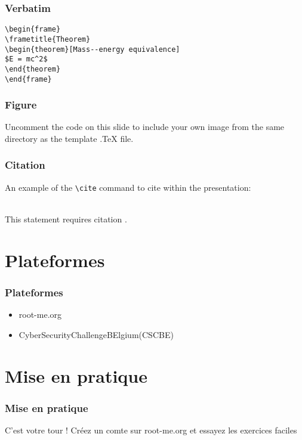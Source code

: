 \documentclass{beamer}
\begin{document}

\begin{frame}[fragile] %
\frametitle{Verbatim}
\begin{example}
\begin{verbatim}
\begin{frame}
\frametitle{Theorem}
\begin{theorem}[Mass--energy equivalence]
$E = mc^2$
\end{theorem}
\end{frame}\end{verbatim}
\end{example}
\end{frame}


\begin{frame}
\frametitle{Figure}
Uncomment the code on this slide to include your own image from the same directory as the template .TeX file.
\end{frame}


\begin{frame}[fragile] %
\frametitle{Citation}
An example of the \verb|\cite| command to cite within the presentation:\\~

This statement requires citation \cite{p1}.
\end{frame}


\section{Plateformes}

\begin{frame}\frametitle{Plateformes}
    \begin{itemize}
        \item root-me.org
        \item CyberSecurityChallengeBElgium(CSCBE)
    \end{itemize}
\end{frame}



\section{Mise en pratique}
\begin{frame}
\frametitle{Mise en pratique}

    C'est votre tour ! Créez un comte sur root-me.org et essayez les exercices faciles

\end{frame}
\end{document}

